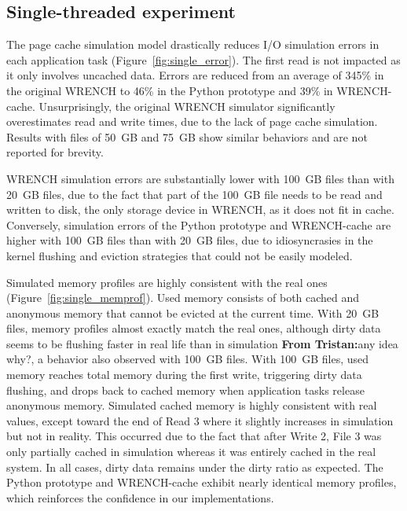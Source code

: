 \documentclass[conference]{IEEEtran}
\newcommand{\tristan}[1]{\color{orange}\textbf{From Tristan:}#1\color{black}}
\newcommand{\wrench}{WRENCH\xspace}
\begin{document}
        \subsection{Single-threaded experiment}

        The page cache simulation model drastically reduces I/O simulation
        errors in each application task (Figure~\ref{fig:single_error}). The first read is not impacted
        as it only involves uncached data. Errors are reduced from an average
        of 345\% in the original \wrench to 46\% in the Python prototype and
        39\% in \wrench-cache. Unsurprisingly, the original \wrench simulator
        significantly overestimates read and write times, due to the lack
        of page cache simulation. Results with files of 50~GB and 75~GB
        show similar behaviors and are not reported for brevity.

        \wrench simulation errors are substantially lower with 100~GB
        files than with 20~GB files, due to the fact that part of the
        100~GB file needs to be read and written to disk, the only storage
        device in \wrench, as it does not fit in cache. Conversely,
        simulation errors of the Python prototype and \wrench-cache are higher with
        100~GB files than with 20~GB files, due to idiosyncrasies in the kernel
        flushing and eviction strategies that could not be easily modeled.

        Simulated memory profiles are highly consistent with the real ones
        (Figure~\ref{fig:single_memprof}). Used memory consists of both
        cached and anonymous memory that cannot be evicted at the current
        time. With 20~GB files, memory profiles almost exactly match the
        real ones, although dirty data seems to be flushing faster in real
        life than in simulation \tristan{any idea why?}, a behavior also
        observed with 100~GB files. With 100~GB files, used memory reaches
        total memory during the first write, triggering dirty data
        flushing, and drops back to cached memory when application tasks
        release anonymous memory. Simulated cached memory is highly
        consistent with real values, except toward the end of Read 3 where
        it slightly increases in simulation but not in reality. This
        occurred due to the fact that after Write 2, File 3 was only partially
        cached in simulation whereas it was entirely cached in the real
        system. In all cases, dirty data remains under the dirty ratio as
        expected. The Python prototype and \wrench-cache exhibit nearly
        identical memory profiles, which reinforces the confidence in our
        implementations.
\end{document}
